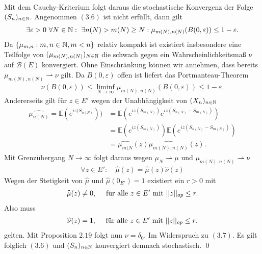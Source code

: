 \begin{proof*}
\begin{align}
    \end{align}
    Mit dem Cauchy-Kriterium folgt daraus die stochastische Konvergenz der Folge $(S_n)_{n \in \mathbb{N}}$. Angenommen $(3.6)$ ist nicht erfüllt, dann gilt
    \begin{align*}
        \exists \varepsilon > 0 \ \forall N \in \mathbb{N}: \ \exists n(N) > m(N) \geq N: \mu_{m(N), n(N)}(B(0, \varepsilon)) \leq 1 - \varepsilon.
    \end{align*}
    Da $\{\mu_{m,n}: m,n \in \mathbb{N}, m < n \}$ relativ kompakt ist existiert insbesondere eine Teilfolge von $(\mu_{m(N),n(N)})_{N \in \mathbb{N}}$ die schwach gegen ein Wahrscheinlichkeitsmaß $\nu$ auf $\mathcal{B}(E)$ konvergiert.
    Ohne Einschränkung können wir annehmen, dass bereits $\mu_{m(N),n(N)} \rightharpoonup \nu$ gilt. Da $B(0, \varepsilon)$ offen ist liefert das Portmanteau-Theorem
    \begin{align}
        \nu(B(0, \varepsilon)) \leq \liminf_{N \to \infty}\mu_{m(N),n(N)}(B(0,\varepsilon)) \leq 1 - \varepsilon. 
    \end{align}
    Andererseits gilt für $z \in E'$ wegen der Unabhängigkeit von $(X_n)_{n \in \mathbb{N}}$
    \begin{align*}
        \widehat{\mu_{n(N)}} = \mathbb{E}(e^{iz(S_{n(N)}})) &= \mathbb{E}(e^{iz(S_{m(N)})}e^{iz(S_{n(N)} - S_{m(N)})}) \\\
                                                   &= \mathbb{E}(e^{iz(S_{m(N)})})\mathbb{E}(e^{iz(S_{n(N)} - S_{m(N)})}) \\\
                                                   &= \widehat{\mu_{m(N}}(z)\widehat{\mu_{m(N),n(N)}}(z). 
    \end{align*}
    Mit Grenzübergang $N \to \infty$ folgt daraus wegen $\mu_N \rightharpoonup \mu$ und $\mu_{m(N),n(N)} \rightharpoonup \nu$
    \begin{align*}
        \forall z \in E': \quad \widehat{\mu}(z) = \widehat{\mu}(z) \widehat{\nu}(z)
    \end{align*}
    Wegen der Stetigkeit von $\widehat{\mu}$ und $\widehat{\mu}(0_{E'}) = 1$ existiert ein $r>0$ mit 
    \begin{align*}
        \widehat{\mu}(z) \neq 0, \quad \text{ für alle } z \in E' \text{ mit } \lvert\lvert z \rvert\rvert_{op} \leq r. 
    \end{align*}
    Also muss 
    \begin{align*}
        \widehat{\nu}(z) = 1, \quad \text{ für alle } z \in E' \text{ mit } \lvert\lvert z \rvert\rvert_{op} \leq r. 
    \end{align*}
    gelten. Mit Proposition $2.19$ folgt nun $\nu = \delta_0$. Im Widerspruch zu $(3.7)$. Es gilt folglich $(3.6)$ und $(S_n)_{n \in \mathbb{N}}$ konvergiert demnach stochastisch. 
    \qed
\end{proof*}

